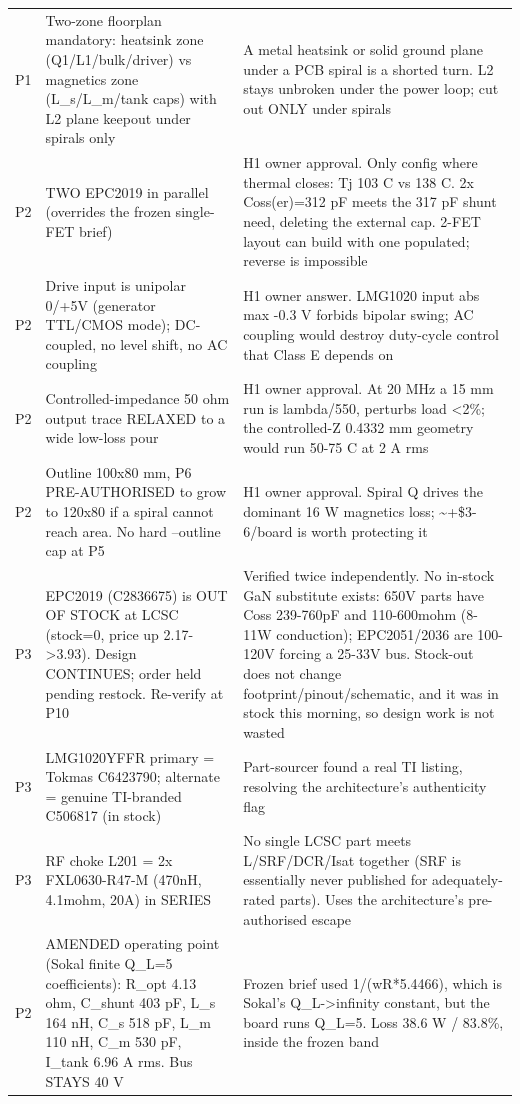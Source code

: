 \documentclass[11pt,a4paper]{article}
\begin{document}
{\begin{longtable}{lp{5.2cm}p{7.2cm}}
P1 & Two-zone floorplan mandatory: heatsink zone (Q1/L1/bulk/driver) vs magnetics zone (L\_s/L\_m/tank caps) with L2 plane keepout under spirals only & A metal heatsink or solid ground plane under a PCB spiral is a shorted turn. L2 stays unbroken under the power loop; cut out ONLY under spirals \\
P2 & TWO EPC2019 in parallel (overrides the frozen single-FET brief) & H1 owner approval. Only config where thermal closes: Tj 103 C vs 138 C. 2x Coss(er)=312 pF meets the 317 pF shunt need, deleting the external cap. 2-FET layout can build with one populated; reverse is impossible \\
P2 & Drive input is unipolar 0/+5V (generator TTL/CMOS mode); DC-coupled, no level shift, no AC coupling & H1 owner answer. LMG1020 input abs max -0.3 V forbids bipolar swing; AC coupling would destroy duty-cycle control that Class E depends on \\
P2 & Controlled-impedance 50 ohm output trace RELAXED to a wide low-loss pour & H1 owner approval. At 20 MHz a 15 mm run is lambda/550, perturbs load \textless{}2\%; the controlled-Z 0.4332 mm geometry would run 50-75 C at 2 A rms \\
P2 & Outline 100x80 mm, P6 PRE-AUTHORISED to grow to 120x80 if a spiral cannot reach area. No hard --outline cap at P5 & H1 owner approval. Spiral Q drives the dominant 16 W magnetics loss; \textasciitilde{}+\$3-6/board is worth protecting it \\
P3 & EPC2019 (C2836675) is OUT OF STOCK at LCSC (stock=0, price up 2.17-\textgreater{}3.93). Design CONTINUES; order held pending restock. Re-verify at P10 & Verified twice independently. No in-stock GaN substitute exists: 650V parts have Coss 239-760pF and 110-600mohm (8-11W conduction); EPC2051/2036 are 100-120V forcing a 25-33V bus. Stock-out does not change footprint/pinout/schematic, and it was in stock this morning, so design work is not wasted \\
P3 & LMG1020YFFR primary = Tokmas C6423790; alternate = genuine TI-branded C506817 (in stock) & Part-sourcer found a real TI listing, resolving the architecture's authenticity flag \\
P3 & RF choke L201 = 2x FXL0630-R47-M (470nH, 4.1mohm, 20A) in SERIES & No single LCSC part meets L/SRF/DCR/Isat together (SRF is essentially never published for adequately-rated parts). Uses the architecture's pre-authorised escape \\
P2 & AMENDED operating point (Sokal finite Q\_L=5 coefficients): R\_opt 4.13 ohm, C\_shunt 403 pF, L\_s 164 nH, C\_s 518 pF, L\_m 110 nH, C\_m 530 pF, I\_tank 6.96 A rms. Bus STAYS 40 V & Frozen brief used 1/(wR{*}5.4466), which is Sokal's Q\_L-\textgreater{}infinity constant, but the board runs Q\_L=5. Loss 38.6 W / 83.8\%, inside the frozen band \\

\end{longtable}}
\end{document}
